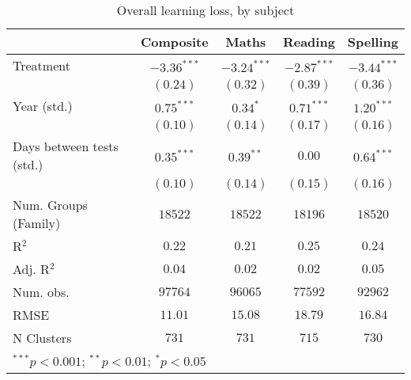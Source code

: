
\begin{table}
\begin{center}
\begin{tabular}{l c c c c}
\hline
 & Composite & Maths & Reading & Spelling \\
\hline
Treatment                 & $-3.36^{***}$ & $-3.24^{***}$ & $-2.87^{***}$ & $-3.44^{***}$ \\
                          & $(0.24)$      & $(0.32)$      & $(0.39)$      & $(0.36)$      \\
Year (std.)               & $0.75^{***}$  & $0.34^{*}$    & $0.71^{***}$  & $1.20^{***}$  \\
                          & $(0.10)$      & $(0.14)$      & $(0.17)$      & $(0.16)$      \\
Days between tests (std.) & $0.35^{***}$  & $0.39^{**}$   & $0.00$        & $0.64^{***}$  \\
                          & $(0.10)$      & $(0.14)$      & $(0.15)$      & $(0.16)$      \\
\hline
Num. Groups (Family)      & $18522$       & $18522$       & $18196$       & $18520$       \\
R$^2$                     & $0.22$        & $0.21$        & $0.25$        & $0.24$        \\
Adj. R$^2$                & $0.04$        & $0.02$        & $0.02$        & $0.05$        \\
Num. obs.                 & $97764$       & $96065$       & $77592$       & $92962$       \\
RMSE                      & $11.01$       & $15.08$       & $18.79$       & $16.84$       \\
N Clusters                & $731$         & $731$         & $715$         & $730$         \\
\hline
\multicolumn{5}{l}{\scriptsize{$^{***}p<0.001$; $^{**}p<0.01$; $^{*}p<0.05$}}
\end{tabular}
\caption{Overall learning loss, by subject}
\label{table:overall}
\end{center}
\end{table}
